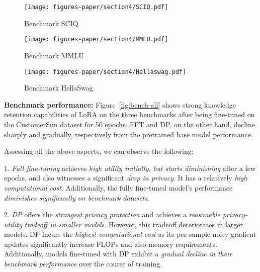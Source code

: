\begin{figure*}[!t]
    \centering
        \begin{subfigure}{.32\linewidth}
       \texttt{[image: figures-paper/section4/SCIQ.pdf]}
        \caption{Benchmark SCIQ}
        \label{fig:sciq_all}
    \end{subfigure}
    \begin{subfigure}{.32\linewidth}
       \texttt{[image: figures-paper/section4/MMLU.pdf]}
        \caption{Benchmark MMLU}
        \label{fig:mmlu_all}
    \end{subfigure}
     \begin{subfigure}{.32\linewidth}
       \texttt{[image: figures-paper/section4/Hellaswag.pdf]}
        \caption{Benchmark HellaSwag}
        \label{fig:hs_all}
    \end{subfigure}
    \caption{
    LoRA demonstrates superior knowledge retention on benchmark datasets throughout the training regime on the CustomerSim dataset, while FFT and DP show fragility with sharp and gradual performance declines, respectively.
    }
    \label{fig:bench-all}
\end{figure*}

\noindent
\textbf{Benchmark performance:} Figure~\ref{fig:bench-all} shows strong knowledge retention capabilities of LoRA on the three benchmarks after being fine-tuned on the CustomerSim dataset for 50 epochs.
FFT and DP, on the other hand, decline sharply and gradually, respectively from the pretrained base model performance.

\noindent
Assessing all the above aspects, we can observe the following: 

1. \textit{Full fine-tuning} achieves \textit{high utility initially, but starts diminishing} after a few epochs, and also witnesses a significant \textit{drop in privacy}.
It has a relatively \textit{high computational cost}.
Additionally, the fully fine-tuned model's performance \textit{diminishes significantly on benchmark datasets}.

2. \textit{DP} offers the \textit{strongest privacy protection} and achieves a \textit{reasonable privacy-utility tradeoff in smaller models}.
However, this tradeoff deteriorates in larger models.
DP incurs the \textit{highest computational cost} as its per-sample noisy gradient updates significantly increase FLOPs and also memory requirements.
Additionally, models fine-tuned with DP exhibit a \textit{gradual decline in their benchmark performance} over the course of training.

